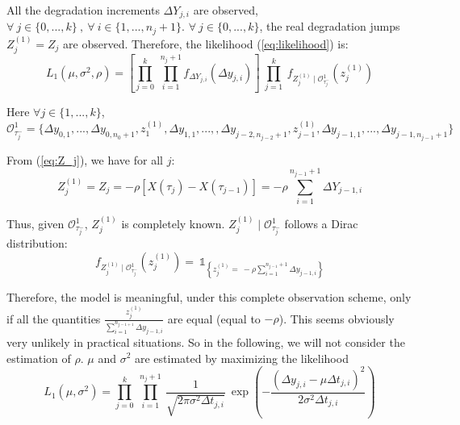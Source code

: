 All the degradation increments $\Delta Y_{j,i}$ are observed, $\forall\ j \in \{0,...,k\}\ ,\ \forall\ i \in \{1,...,n_j+1\}$. $\forall\ j \in \{0,...,k\}$, the real degradation jumps $Z_j^{(1)}=Z_j$ are observed. Therefore, the likelihood (\ref{eq:likelihood}) is:
\begin{equation}
L_1(\mu,\sigma^2,\rho)=\left[\prod\limits_{j=0}^k \ \prod\limits_{i=1}^{n_j+1} f_{\Delta Y_{j,i}} (\Delta y_{j,i})\right] \ \prod\limits_{j=1}^k \ f_{Z_j^{(1)} \mid \mathcal{O}_{\tau_j^-}^1}(z_j^{(1)})
\label{eq:like_scheme1}
\end{equation}

\noindent Here $\forall j \in \{1,...,k\}$,\\
$\mathcal{O}_{\tau_j^-}^1=\{\Delta y_{0,1},...,\Delta y_{0,n_0+1},z_1^{(1)},\Delta y_{1,1},...,,\Delta y_{j-2,n_{j-2}+1},z_{j-1}^{(1)},\Delta y_{j-1,1},...,\Delta y_{j-1,n_{j-1}+1}\}$

\noindent From (\ref{eq:Z_j}), we have for all $j$:
\begin{equation}
Z_j^{(1)} = Z_j  = -\rho \left[X(\tau_{j})-X(\tau_{j-1})\right] = -\rho \sum\limits_{i=1}^{n_{j-1}+1} \Delta Y_{j-1,i}
\end{equation}

\noindent Thus, given $\mathcal{O}^1_{\tau_j^-}$,  $Z_j^{(1)}$ is completely known. $Z_j^{(1)}\mid \mathcal{O}_{\tau_j^-}^1$ follows a Dirac distribution:
$$f_{Z_j^{(1)}\mid \mathcal{O}_{\tau_j^-}^1}(z_j^{(1)})= \ \mathds{1}_{\left\{z_j^{(1)}=\ -\rho \sum\limits_{i=1}^{n_{j-1}+1} \Delta y_{j-1,i}\right\}}$$

\noindent Therefore, the model is meaningful, under this complete observation scheme, only if all the quantities $\frac{z_j^{(1)}}{\sum \limits_{i=1}^{n_{j-1+1}} \Delta y_{j-1,i}}$ are equal (equal to $-\rho$). This seems obviously very unlikely in practical situations. So in the following, we will not consider the estimation of $\rho$. $\mu$ and $\sigma^2$ are estimated by maximizing the likelihood
\begin{equation}
L_1 \left(\mu,\sigma^2 \right) 
=\prod \limits_{j=0}^{k} \  \prod \limits_{i=1}^{n_{j}+1} \ \frac{1}{\sqrt{2 \pi \sigma^2 \Delta t_{j,i}}} \ \exp\left( -\frac{(\Delta y_{j,i}-\mu \Delta t_{j,i})^2}{2\sigma^2 \Delta t_{j,i}} \right)
\end{equation}

